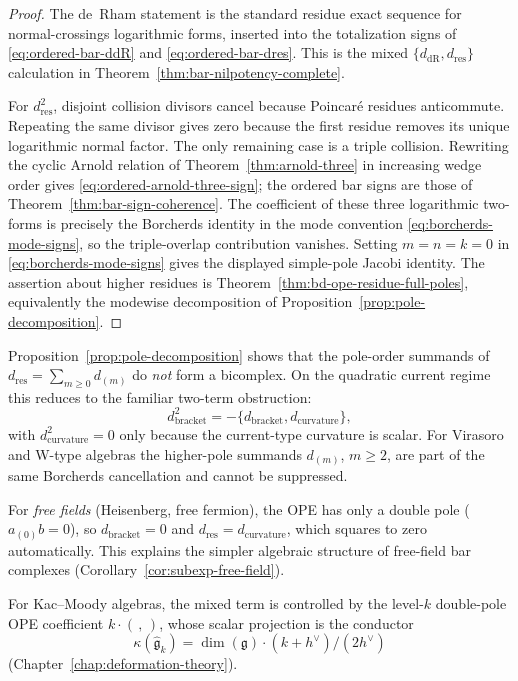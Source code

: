 \begin{proof}
The de~Rham statement is the standard residue exact sequence for
normal-crossings logarithmic forms, inserted into the totalization
signs of \eqref{eq:ordered-bar-ddR} and
\eqref{eq:ordered-bar-dres}. This is the mixed
\(\{d_{\mathrm{dR}},d_{\mathrm{res}}\}\) calculation in
Theorem~\ref{thm:bar-nilpotency-complete}.

For \(d_{\mathrm{res}}^2\), disjoint collision divisors cancel because
Poincar\'e residues anticommute. Repeating the same divisor gives zero
because the first residue removes its unique logarithmic normal
factor. The only remaining case is a triple collision. Rewriting the
cyclic Arnold relation of Theorem~\ref{thm:arnold-three} in increasing
wedge order gives \eqref{eq:ordered-arnold-three-sign}; the ordered
bar signs are those of Theorem~\ref{thm:bar-sign-coherence}. The
coefficient of these three logarithmic two-forms is precisely the
Borcherds identity in the mode convention
\eqref{eq:borcherds-mode-signs}, so the triple-overlap contribution
vanishes. Setting \(m=n=k=0\) in
\eqref{eq:borcherds-mode-signs} gives the displayed simple-pole
Jacobi identity. The assertion about higher residues is
Theorem~\ref{thm:bd-ope-residue-full-poles}, equivalently the
modewise decomposition of Proposition~\ref{prop:pole-decomposition}.
\end{proof}

\begin{remark}\label{rem:bicomplex-obstruction}
Proposition~\ref{prop:pole-decomposition} shows that the pole-order
summands of $d_{\mathrm{res}}=\sum_{m\ge0}d_{(m)}$ do \emph{not} form a
bicomplex. On the quadratic current regime this reduces to the familiar
two-term obstruction:
\[
d_{\mathrm{bracket}}^2
=-\{d_{\mathrm{bracket}},d_{\mathrm{curvature}}\},
\]
with $d_{\mathrm{curvature}}^2=0$ only because the current-type
curvature is scalar. For Virasoro and W-type algebras the higher-pole
summands $d_{(m)}$, $m\ge2$, are part of the same Borcherds
cancellation and cannot be suppressed.

For \emph{free fields} (Heisenberg, free fermion), the OPE has only a double pole ($a_{(0)}b = 0$), so $d_{\mathrm{bracket}} = 0$ and $d_{\mathrm{res}} = d_{\mathrm{curvature}}$, which squares to zero automatically. This explains the simpler algebraic structure of free-field bar complexes (Corollary~\ref{cor:subexp-free-field}).

For Kac--Moody algebras, the mixed term is controlled by the level-$k$
double-pole OPE coefficient $k \cdot (\,,\,)$, whose scalar projection
is the conductor
\[
\kappa(\widehat{\mathfrak{g}}_k)
= \dim(\mathfrak{g})\cdot(k+h^\vee)/(2h^\vee)
\]
(Chapter~\ref{chap:deformation-theory}).
\end{remark}

